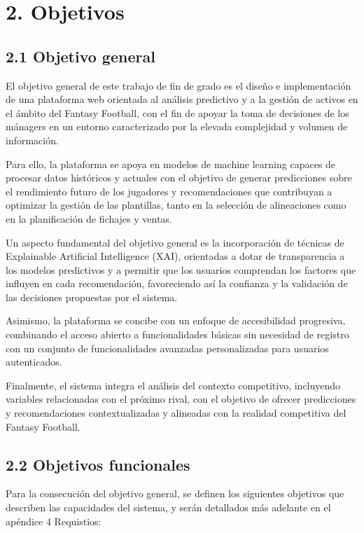 \section*{2. Objetivos}

\subsection{2.1 Objetivo general}

El objetivo general de este trabajo de fin de grado es el diseño e implementación de una 
plataforma web orientada al análisis predictivo y a la gestión de activos en el ámbito del 
Fantasy Football, con el fin de apoyar la toma de decisiones de los mánagers en un entorno 
caracterizado por la elevada complejidad y volumen de información.

Para ello, la plataforma se apoya en modelos de machine learning capaces de procesar datos 
históricos y actuales con el objetivo de generar predicciones sobre el rendimiento futuro de 
los jugadores y recomendaciones que contribuyan a optimizar la gestión de las plantillas, 
tanto en la selección de alineaciones como en la planificación de fichajes y ventas.

Un aspecto fundamental del objetivo general es la incorporación de técnicas de Explainable 
Artificial Intelligence (XAI), orientadas a dotar de transparencia a los modelos predictivos 
y a permitir que los usuarios comprendan los factores que influyen en cada recomendación, 
favoreciendo así la confianza y la validación de las decisiones propuestas por el sistema.

Asimismo, la plataforma se concibe con un enfoque de accesibilidad progresiva, combinando 
el acceso abierto a funcionalidades básicas sin necesidad de registro con un conjunto de 
funcionalidades avanzadas personalizadas para usuarios autenticados.

Finalmente, el sistema integra el análisis del contexto competitivo, incluyendo variables 
relacionadas con el próximo rival, con el objetivo de ofrecer predicciones y recomendaciones 
contextualizadas y alineadas con la realidad competitiva del Fantasy Football.

\subsection{2.2 Objetivos funcionales}

Para la consecución del objetivo general, se definen los siguientes objetivos que describen 
las capacidades del sistema, y serán detallados más adelante en el apéndice 4 Requistios:

